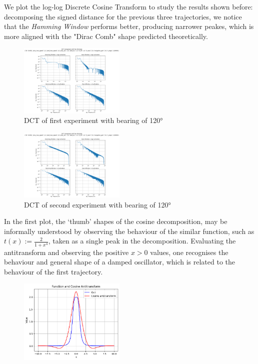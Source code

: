 \documentclass[10pt, twocolumn]{article}
\begin{document}
        We plot the log-log Discrete Cosine Transform to study the results shown before: decomposing the signed distance for the previous three trajectories, we notice that the \textit{Hamming Window} performs better, producing narrower peakes, which is more aligned with the "Dirac Comb" shape predicted theoretically.
        \begin{figure}[H]
          \centering
          \includegraphics[width=0.45\textwidth]{figures/dct_120_loglog.png}
          \caption{DCT of first experiment with bearing of 120°}
          \label{fig:dct1}
        \end{figure}

        \begin{figure}[H]
          \centering
          \includegraphics[width=0.45\textwidth]{figures/dct_240_loglog.png}
          \caption{DCT of second experiment with bearing of 120°}
          \label{fig:dct2}
        \end{figure}

        In the first plot, the `thumb' shapes of the cosine decomposition, may be informally understood by observing the behaviour of the similar function, such as $t(x) := \frac{2}{1+x^4}$, taken as a single peak in the decomposition. Evaluating the antitransform and observing the positive $x>0$ values, one recognises the behaviour and general shape of a damped oscillator, which is related to the behaviour of the first trajectory.

        \begin{figure}[H]
          \centering
          \includegraphics[width=0.45\textwidth]{figures/f_and_cos_antitr.png}
          \label{fig:antitransform}
        \end{figure}
\end{document}
